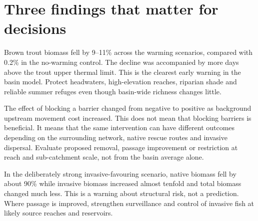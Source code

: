 \documentclass[10pt,a4paper]{article}
\begin{document}
\clearpage
\section*{Three findings that matter for decisions}

\begin{tcolorbox}[colback=actiongreen,colframe=green!45!black,title=\textbf{1. Protect cold-water refuges now},fonttitle=\bfseries]
Brown trout biomass fell by 9--11\% across the warming scenarios, compared with 0.2\% in the no-warming control. The decline was accompanied by more days above the trout upper thermal limit. This is the clearest early warning in the basin model. Protect headwaters, high-elevation reaches, riparian shade and reliable summer refuges even though basin-wide richness changes little.
\end{tcolorbox}

\begin{tcolorbox}[colback=warningorange,colframe=orange!60!black,title=\textbf{2. Assess every barrier in its network context},fonttitle=\bfseries]
The effect of blocking a barrier changed from negative to positive as background upstream movement cost increased. This does not mean that blocking barriers is beneficial. It means that the same intervention can have different outcomes depending on the surrounding network, native rescue routes and invasive dispersal. Evaluate proposed removal, passage improvement or restriction at reach and sub-catchment scale, not from the basin average alone.
\end{tcolorbox}

\begin{tcolorbox}[colback=riskred,colframe=red!55!black,title=\textbf{3. Pair connectivity work with invasive control},fonttitle=\bfseries]
In the deliberately strong invasive-favouring scenario, native biomass fell by about 90\% while invasive biomass increased almost tenfold and total biomass changed much less. This is a warning about structural risk, not a prediction. Where passage is improved, strengthen surveillance and control of invasive fish at likely source reaches and reservoirs.
\end{tcolorbox}
\end{document}
